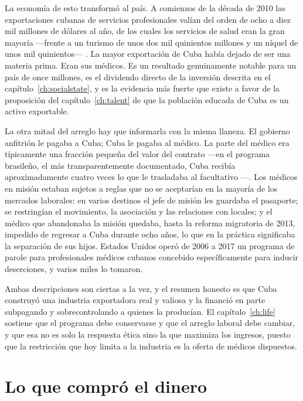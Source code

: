 La economía de esto transformó al país. A comienzos de la década de 2010 las
exportaciones cubanas de servicios profesionales valían del orden de ocho a diez
mil millones de dólares al año, de los cuales los servicios de salud eran la gran
mayoría ---frente a un turismo de unos dos mil quinientos millones y un níquel de
unos mil quinientos--- \citep{onei,mesalago2013}.\unv{} La mayor exportación de
Cuba había dejado de ser una materia prima. Eran sus médicos. Es un resultado
genuinamente notable para un país de once millones, es el dividendo directo de la
inversión descrita en el capítulo~\ref{ch:socialstate}, y es la evidencia más
fuerte que existe a favor de la proposición del capítulo~\ref{ch:talent} de que la
población educada de Cuba es un activo exportable.

La otra mitad del arreglo hay que informarla con la misma llaneza. El gobierno
anfitrión le pagaba a Cuba; Cuba le pagaba al médico. La parte del médico era
típicamente una fracción pequeña del valor del contrato ---en el programa
brasileño, el más transparentemente documentado, Cuba recibía aproximadamente
cuatro veces lo que le trasladaba al facultativo \citep{kirk2015}---.\unv{} Los
médicos en misión estaban sujetos a reglas que no se aceptarían en la mayoría de
los mercados laborales: en varios destinos el jefe de misión les guardaba el
pasaporte; se restringían el movimiento, la asociación y las relaciones con
locales; y el médico que abandonaba la misión quedaba, hasta la reforma migratoria
de 2013, impedido de regresar a Cuba durante ocho años, lo que en la práctica
significaba la separación de sus hijos. Estados Unidos operó de 2006 a 2017 un
programa de parole para profesionales médicos cubanos concebido específicamente
para inducir deserciones, y varios miles lo tomaron.

Ambas descripciones son ciertas a la vez, y el resumen honesto es que Cuba
construyó una industria exportadora real y valiosa y la financió en parte
subpagando y sobrecontrolando a quienes la producían. El capítulo~\ref{ch:life}
sostiene que el programa debe conservarse y que el arreglo laboral debe cambiar, y
que esa no es solo la respuesta ética sino la que maximiza los ingresos, puesto
que la restricción que hoy limita a la industria es la oferta de médicos
dispuestos.

\section{Lo que compró el dinero}

